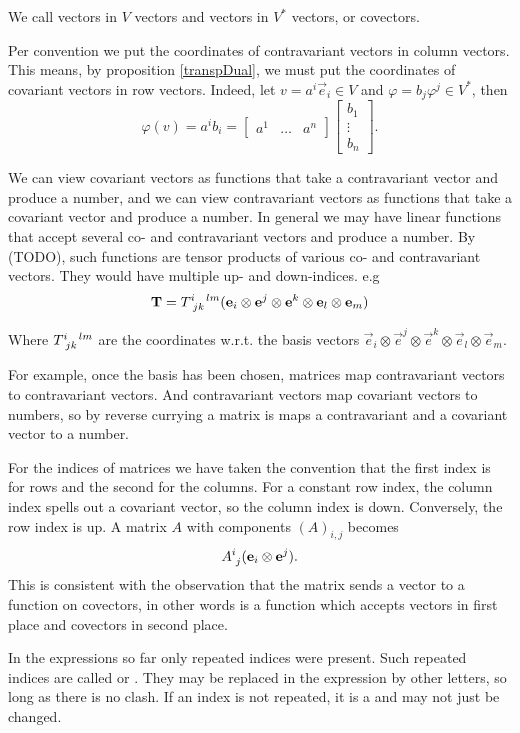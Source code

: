 We call vectors in $V$  vectors and vectors in $V^*$  vectors, or covectors.

Per convention we put the coordinates of contravariant vectors in column vectors. This means, by proposition \ref{transpDual}, we must put the coordinates of covariant vectors in row vectors. Indeed, let $v=a^i \vec{e}_i\in V$ and $\varphi = b_j\varphi^j \in V^*$, then
\[ \varphi(v) = a^ib_i = \begin{bmatrix}
a^1 & \hdots & a^n
\end{bmatrix}\begin{bmatrix}
b_1 \\ \vdots  \\ b_n
\end{bmatrix}. \]

We can view covariant vectors as functions that take a contravariant vector and produce a number, and we can view contravariant vectors as functions that take a covariant vector and produce a number. In general we may have linear functions that accept several co- and contravariant vectors and produce a number. By (TODO), such functions are tensor products of various co- and contravariant vectors. They would have multiple up- and down-indices. e.g\
\[ \vec{T} = \tensor{T}{^i_j_k^l^m}(\vec{e}_i\otimes \vec{e}^j\otimes \vec{e}^k\otimes \vec{e}_l \otimes \vec{e}_m) \]

Where $\tensor{T}{^i_j_k^l^m}$ are the coordinates w.r.t. the basis vectors $\vec{e}_i\otimes \vec{e}^j\otimes \vec{e}^k \otimes\vec{e}_l \otimes \vec{e}_m$.

For example, once the basis has been chosen, matrices map contravariant vectors to contravariant vectors. And contravariant vectors map covariant vectors to numbers, so by reverse currying a matrix is maps a contravariant and a covariant vector to a number.

For the indices of matrices we have taken the convention that the first index is for rows and the second for the columns. For a constant row index, the column index spells out a covariant vector, so the column index is down. Conversely, the row index is up. A matrix $A$ with components $(A)_{i,j}$ becomes
\[ \tensor{A}{^i_j}(\vec{e}_i\otimes \vec{e}^j). \]
This is consistent with the observation that the matrix sends a vector to a function on covectors, in other words is a function which accepts vectors in first place and covectors in second place.

In the expressions so far only repeated indices were present. Such repeated indices are called   or . They may be replaced in the expression by other letters, so long as there is no clash. If an index is not repeated, it is a  and may not just be changed.

